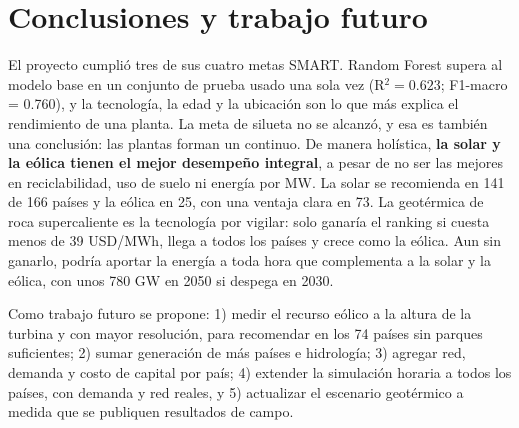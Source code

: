 \documentclass[journal,letterpaper]{IEEEtran}
\begin{document}
\section{Conclusiones y trabajo futuro}
El proyecto cumplió tres de sus cuatro metas SMART. Random Forest supera al modelo base en un conjunto de prueba usado una sola vez (R$^2 = 0.623$; F1-macro = 0.760), y la tecnología, la edad y la ubicación son lo que más explica el rendimiento de una planta. La meta de silueta no se alcanzó, y esa es también una conclusión: las plantas forman un continuo. De manera holística, \textbf{la solar y la eólica tienen el mejor desempeño integral}, a pesar de no ser las mejores en reciclabilidad, uso de suelo ni energía por MW. La solar se recomienda en 141 de 166 países y la eólica en 25, con una ventaja clara en 73. La geotérmica de roca supercaliente es la tecnología por vigilar: solo ganaría el ranking si cuesta menos de 39 USD/MWh, llega a todos los países y crece como la eólica. Aun sin ganarlo, podría aportar la energía a toda hora que complementa a la solar y la eólica, con unos 780 GW en 2050 si despega en 2030.

Como trabajo futuro se propone: 1) medir el recurso eólico a la altura de la turbina y con mayor resolución, para recomendar en los 74 países sin parques suficientes; 2) sumar generación de más países e hidrología; 3) agregar red, demanda y costo de capital por país; 4) extender la simulación horaria a todos los países, con demanda y red reales, y 5) actualizar el escenario geotérmico a medida que se publiquen resultados de campo.

\end{document}
